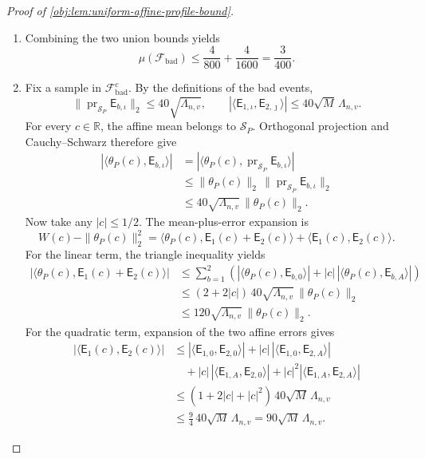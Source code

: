 \begin{proof}[Proof of \cref{obj:lem:uniform-affine-profile-bound}]
\begin{enumerate}
\item
Combining the two union bounds yields
\[
\mu(\mathcal F_{\mathrm{bad}})
\le
\frac4{800}+\frac4{1600}
=
\frac3{400}.
\]

\item
Fix a sample in \(\mathcal F_{\mathrm{bad}}^c\). By the definitions of the bad events,
\[
\|\operatorname{pr}_{\mathcal S_P}\mathsf E_{b,\iota}\|_2
\le40\sqrt{\Lambda_{n,v}},
\qquad
|\langle\mathsf E_{1,\iota},\mathsf E_{2,\jmath}\rangle|
\le40\sqrt M\,\Lambda_{n,v}.
\]
For every \(c\in\mathbb R\), the affine mean belongs to \(\mathcal S_P\). Orthogonal projection and Cauchy--Schwarz therefore give
\[
\begin{aligned}
|\langle\theta_P(c),\mathsf E_{b,\iota}\rangle|
&=
|\langle\theta_P(c),
\operatorname{pr}_{\mathcal S_P}\mathsf E_{b,\iota}\rangle|\\
&\le
\|\theta_P(c)\|_2\,
\|\operatorname{pr}_{\mathcal S_P}\mathsf E_{b,\iota}\|_2\\
&\le
40\sqrt{\Lambda_{n,v}}\,\|\theta_P(c)\|_2.
\end{aligned}
\]
Now take any \(|c|\le1/2\). The mean-plus-error expansion is
\[
W(c)-\|\theta_P(c)\|_2^2
=
\langle\theta_P(c),\mathsf E_1(c)+\mathsf E_2(c)\rangle
+
\langle\mathsf E_1(c),\mathsf E_2(c)\rangle.
\]
For the linear term, the triangle inequality yields
\[
\begin{aligned}
|\langle\theta_P(c),\mathsf E_1(c)+\mathsf E_2(c)\rangle|
&\le
\sum_{b=1}^{2}
\left(
|\langle\theta_P(c),\mathsf E_{b,0}\rangle|
+
|c|\,|\langle\theta_P(c),\mathsf E_{b,A}\rangle|
\right)\\
&\le
(2+2|c|)\,40\sqrt{\Lambda_{n,v}}\,\|\theta_P(c)\|_2\\
&\le
120\sqrt{\Lambda_{n,v}}\,\|\theta_P(c)\|_2.
\end{aligned}
\]
For the quadratic term, expansion of the two affine errors gives
\[
\begin{aligned}
|\langle\mathsf E_1(c),\mathsf E_2(c)\rangle|
&\le
|\langle\mathsf E_{1,0},\mathsf E_{2,0}\rangle|
+
|c|\,|\langle\mathsf E_{1,0},\mathsf E_{2,A}\rangle|\\
&\quad+
|c|\,|\langle\mathsf E_{1,A},\mathsf E_{2,0}\rangle|
+
|c|^2|\langle\mathsf E_{1,A},\mathsf E_{2,A}\rangle|\\
&\le
(1+2|c|+|c|^2)\,40\sqrt M\,\Lambda_{n,v}\\
&\le
\frac94\,40\sqrt M\,\Lambda_{n,v}
=
90\sqrt M\,\Lambda_{n,v}.
\end{aligned}
\]
\end{enumerate}
\end{proof}
